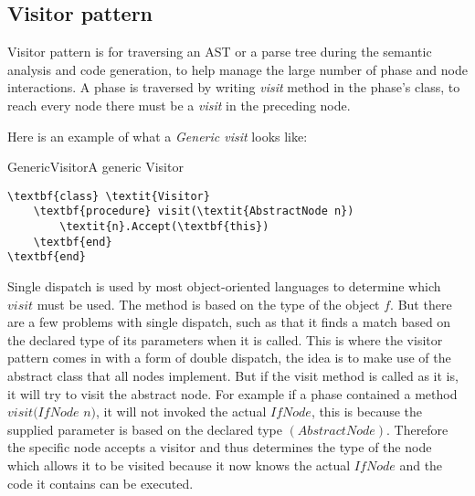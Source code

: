 \subsection{Visitor pattern}
\label{sec:VisitorPattern}
Visitor pattern is for traversing an AST or a parse tree during the semantic analysis and code generation, to help manage the large number of phase and node interactions. A phase is traversed by writing \textit{visit} method in the phase's class, to reach every node there must be a \textit{visit} in the preceding node.

Here is an example of what a \textit{Generic visit} looks like:

\begin{code}{GenericVisitor}{A generic Visitor}
\begin{lstlisting}
\textbf{class} \textit{Visitor}
	\textbf{procedure} visit(\textit{AbstractNode n})
		\textit{n}.Accept(\textbf{this})
	\textbf{end}
\textbf{end}
\end{lstlisting}
\end{code}

Single dispatch is used by most object-oriented languages to determine which $visit$ must be used. The method is based on the type of the object $f$. But there are a few problems with single dispatch, such as that it finds a match based on the declared type of its parameters when it is called. This is where the visitor pattern comes in with a form of double dispatch, the idea is to make use of the abstract class that all nodes implement. But if the visit method is called as it is, it will try to visit the abstract node. For example if a phase contained a method $visit(IfNode$ $n)$, it will not invoked the actual $IfNode$, this is because the supplied parameter is based on the declared type $(AbstractNode)$. Therefore the specific node accepts a visitor and thus determines the type of the node which allows it to be visited because it now knows the actual $IfNode$ and the code it contains can be executed.